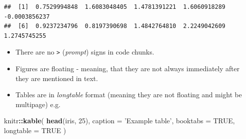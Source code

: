 \documentclass[]{book}
\newenvironment{Shaded}{\begin{snugshade}}{\end{snugshade}}
\newcommand{\KeywordTok}[1]{\textcolor[rgb]{0.13,0.29,0.53}{\textbf{#1}}}
\newcommand{\DataTypeTok}[1]{\textcolor[rgb]{0.13,0.29,0.53}{#1}}
\newcommand{\DecValTok}[1]{\textcolor[rgb]{0.00,0.00,0.81}{#1}}
\newcommand{\StringTok}[1]{\textcolor[rgb]{0.31,0.60,0.02}{#1}}
\newcommand{\OtherTok}[1]{\textcolor[rgb]{0.56,0.35,0.01}{#1}}
\newcommand{\OperatorTok}[1]{\textcolor[rgb]{0.81,0.36,0.00}{\textbf{#1}}}
\newcommand{\NormalTok}[1]{#1}
\providecommand{\tightlist}{%
  \setlength{\itemsep}{0pt}\setlength{\parskip}{0pt}}
\theoremstyle{definition}
\theoremstyle{definition}
\theoremstyle{definition}
\theoremstyle{remark}
\begin{document}
\begin{verbatim}
##  [1]  0.7529994848  1.6083048405  1.4781391221  1.6060918289 -0.0003856237
##  [6]  0.9237234796  0.8197390698  1.4842764810  2.2249042609  1.2745745255
\end{verbatim}

\begin{itemize}
\tightlist
\item
  There are no \texttt{\textgreater{}} (\emph{prompt}) signs in code
  chunks.
\item
  Figures are floating - meaning, that they are not always immediately
  after they are mentioned in text.
\item
  Tables are in \emph{longtable} format (meaning they are not floating
  and might be multipage) e.g.
\end{itemize}

\begin{Shaded}
\begin{Highlighting}[]
\NormalTok{knitr}\OperatorTok{::}\KeywordTok{kable}\NormalTok{(}
  \KeywordTok{head}\NormalTok{(iris, }\DecValTok{25}\NormalTok{), }\DataTypeTok{caption =} \StringTok{'Example table'}\NormalTok{,}
  \DataTypeTok{booktabs =} \OtherTok{TRUE}\NormalTok{, }\DataTypeTok{longtable =} \OtherTok{TRUE}
\NormalTok{)}
\end{Highlighting}
\end{Shaded}
\end{document}

